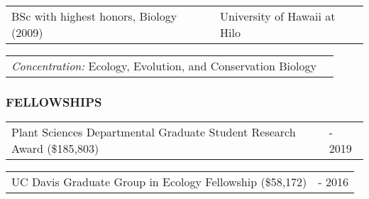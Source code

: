 \documentclass[11pt,english]{article}
\providecommand{\tabularnewline}{\\}
\begin{document}
\vspace{0.5ex}

\begin{tabular}{>{\raggedright}p{4in}>{\raggedleft}p{2in}}
BSc with highest honors, Biology (2009) & University of Hawaii at Hilo\tabularnewline
\end{tabular}

\hspace{1.0em}
\begin{tabular}{p{6in}p{0in}}
\emph{Concentration:} Ecology, Evolution, and Conservation Biology &
\end{tabular}


\subsubsection*{FELLOWSHIPS}
\vspace{-0.5ex}

%
%
%
%


\begin{tabular}{>{\raggedright}p{5.2in}>{\raggedleft}p{0.8in}}
Plant Sciences Departmental Graduate Student Research Award (\$185,803) & 2015 - 2019
\end{tabular}

\begin{tabular}{>{\raggedright}p{5in}>{\raggedleft}p{1in}}
UC Davis Graduate Group in Ecology Fellowship (\$58,172) & 2014 - 2016
\end{tabular}
\end{document}
